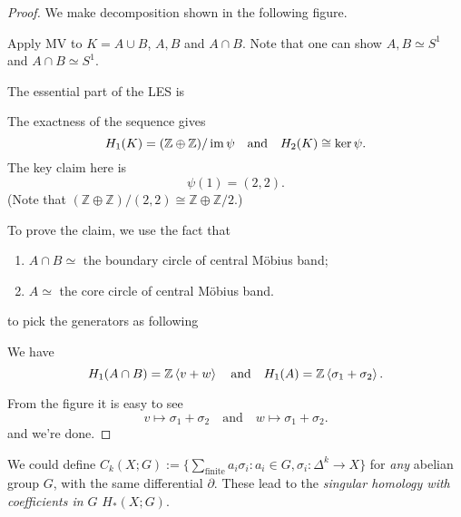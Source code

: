 \documentclass[a4paper,11pt]{article}
\begin{document}
	\begin{proof}
		We make decomposition shown in the following figure.


		Apply MV to $K = A \cup B$, $A,B$ and $A\cap B$. Note that one can show $A, B \simeq S^1$ and $A \cap B \simeq S^1$.

		The essential part of the LES is 
		\begin{center}
		\end{center}

		The exactness of the sequence gives 
		\[
			H_1 (K) = (\mathbb{Z}\oplus \mathbb{Z}) / \operatorname{im} \psi \quad \text{and} \quad H_2(K) \cong \ker \psi.
		\]
		The key claim here is 
		\[
			\psi(1) = (2,2).
		\]
		(Note that $(\mathbb{Z}\oplus \mathbb{Z})/(2,2)\cong \mathbb{Z} \oplus \mathbb{Z}/2$.)

		To prove the claim, we use the fact that
		\begin{enumerate}
			\item $A\cap B \simeq$ the boundary circle of central M\"obius band;
			\item $A \simeq$ the core circle of central M\"obius band.
		\end{enumerate}
		to pick the generators as following
		

		We have
		\[
			H_1(A\cap B) = \mathbb{Z} \expval{v+w} \quad \text{and} \quad H_1(A) = \mathbb{Z}\expval{\sigma_1 + \sigma_2}.
		\]
		
		From the figure it is easy to see
		\[
			v \mapsto \sigma_1 + \sigma_2 \quad \text{and} \quad w \mapsto \sigma_1 + \sigma_2.
		\]
		and we're done.
	\end{proof}

	\begin{rmk}
		We could define $C_k(X; G) := \{\sum _{\text{finite}} a_i \sigma_i : a_i \in G, \sigma_i : \Delta^k \to X\}$ for \emph{any} abelian group $G$, with the same differential $\partial$. These lead to the \emph{singular homology with coefficients in $G$} $H_*(X;G)$.
	\end{rmk}
\end{document}
